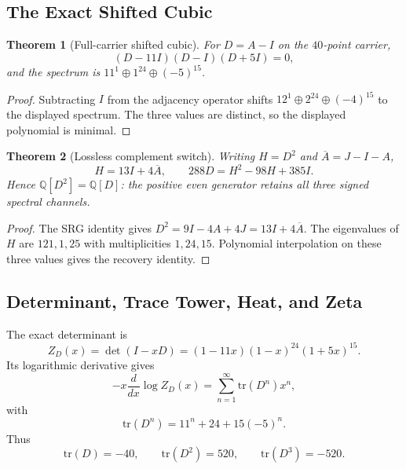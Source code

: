 \documentclass[12pt,a4paper]{article}
\newtheorem{theorem}{Theorem}[section]
\begin{document}
\subsection{The Exact Shifted Cubic}

\begin{theorem}[Full-carrier shifted cubic]\label{thm:mastercubic}
For $D=A-I$ on the $40$-point carrier,
\begin{equation}\label{eq:mastercubic}
  \boxed{(D-11I)(D-I)(D+5I)=0,}
\end{equation}
and the spectrum is $11^1\oplus1^{24}\oplus(-5)^{15}$.
\end{theorem}

\begin{proof}
Subtracting $I$ from the adjacency operator shifts
$12^1\oplus2^{24}\oplus(-4)^{15}$ to the displayed spectrum.  The three
values are distinct, so the displayed polynomial is minimal.
\end{proof}

\begin{theorem}[Lossless complement switch]\label{thm:specdem}
Writing $H=D^2$ and $\overline A=J-I-A$,
\[
  \boxed{H=13I+4\overline A,\qquad
  288D=H^2-98H+385I.}
\]
Hence $\mathbb Q[D^2]=\mathbb Q[D]$: the positive even generator retains
all three signed spectral channels.
\end{theorem}

\begin{proof}
The SRG identity gives
$D^2=9I-4A+4J=13I+4\overline A$.  The eigenvalues of $H$ are
$121,1,25$ with multiplicities $1,24,15$.  Polynomial interpolation on
these three values gives the recovery identity.
\end{proof}

\subsection{Determinant, Trace Tower, Heat, and Zeta}

The exact determinant is
\[
  Z_D(x)=\det(I-xD)=(1-11x)(1-x)^{24}(1+5x)^{15}.
\]
Its logarithmic derivative gives
\begin{equation}\label{eq:trace-tower-gen}
  -x\frac{d}{dx}\log Z_D(x)
  =\sum_{n=1}^{\infty}\mathrm{tr}(D^n)x^n,
\end{equation}
with
\begin{equation}\label{eq:trace-tower-formula}
  \boxed{\mathrm{tr}(D^n)=11^n+24+15(-5)^n.}
\end{equation}
Thus
\[
  \mathrm{tr}(D)=-40,\qquad
  \mathrm{tr}(D^2)=520,\qquad
  \mathrm{tr}(D^3)=-520.
\]
\end{document}
